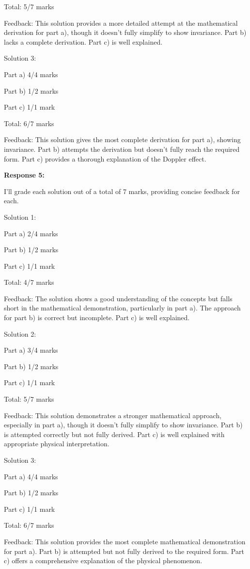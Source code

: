 \documentclass[a4paper,11pt]{article}
\begin{document}
Total: 5/7 marks

Feedback: This solution provides a more detailed attempt at the mathematical derivation for part a), though it doesn't fully simplify to show invariance. Part b) lacks a complete derivation. Part c) is well explained.

Solution 3:

Part a) 4/4 marks

Part b) 1/2 marks

Part c) 1/1 mark

Total: 6/7 marks

Feedback: This solution gives the most complete derivation for part a), showing invariance. Part b) attempts the derivation but doesn't fully reach the required form. Part c) provides a thorough explanation of the Doppler effect.

\bigskip
\textbf{Response 5:}

I'll grade each solution out of a total of 7 marks, providing concise feedback for each.

Solution 1:

Part a) 2/4 marks

Part b) 1/2 marks

Part c) 1/1 mark

Total: 4/7 marks

Feedback: The solution shows a good understanding of the concepts but falls short in the mathematical demonstration, particularly in part a). The approach for part b) is correct but incomplete. Part c) is well explained.

Solution 2:

Part a) 3/4 marks

Part b) 1/2 marks

Part c) 1/1 mark

Total: 5/7 marks

Feedback: This solution demonstrates a stronger mathematical approach, especially in part a), though it doesn't fully simplify to show invariance. Part b) is attempted correctly but not fully derived. Part c) is well explained with appropriate physical interpretation.

Solution 3:

Part a) 4/4 marks

Part b) 1/2 marks

Part c) 1/1 mark

Total: 6/7 marks

Feedback: This solution provides the most complete mathematical demonstration for part a). Part b) is attempted but not fully derived to the required form. Part c) offers a comprehensive explanation of the physical phenomenon.
\end{document}
